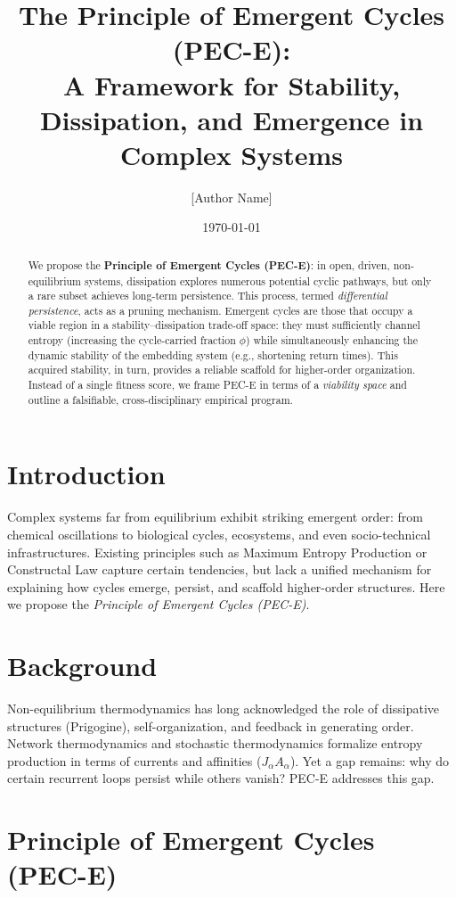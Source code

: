 \documentclass[12pt,a4paper]{article}
\title{The Principle of Emergent Cycles (PEC-E):\\
A Framework for Stability, Dissipation, and Emergence in Complex Systems}
\author{[Author Name]}
\date{\today}
\begin{document}
\maketitle

\begin{abstract}
We propose the \textbf{Principle of Emergent Cycles (PEC-E)}: in open, driven, non-equilibrium systems, dissipation explores numerous potential cyclic pathways, but only a rare subset achieves long-term persistence. This process, termed \emph{differential persistence}, acts as a pruning mechanism. Emergent cycles are those that occupy a viable region in a stability–dissipation trade-off space: they must sufficiently channel entropy (increasing the cycle-carried fraction $\phi$) while simultaneously enhancing the dynamic stability of the embedding system (e.g., shortening return times). This acquired stability, in turn, provides a reliable scaffold for higher-order organization. Instead of a single fitness score, we frame PEC-E in terms of a \emph{viability space} and outline a falsifiable, cross-disciplinary empirical program.
\end{abstract}

\section{Introduction}
Complex systems far from equilibrium exhibit striking emergent order: from chemical oscillations to biological cycles, ecosystems, and even socio-technical infrastructures. Existing principles such as Maximum Entropy Production or Constructal Law capture certain tendencies, but lack a unified mechanism for explaining how cycles emerge, persist, and scaffold higher-order structures. Here we propose the \emph{Principle of Emergent Cycles (PEC-E)}.

\section{Background}
Non-equilibrium thermodynamics has long acknowledged the role of dissipative structures (Prigogine), self-organization, and feedback in generating order. Network thermodynamics and stochastic thermodynamics formalize entropy production in terms of currents and affinities ($J_\alpha A_\alpha$). Yet a gap remains: why do certain recurrent loops persist while others vanish? PEC-E addresses this gap.

\section{Principle of Emergent Cycles (PEC-E)}
\end{document}
